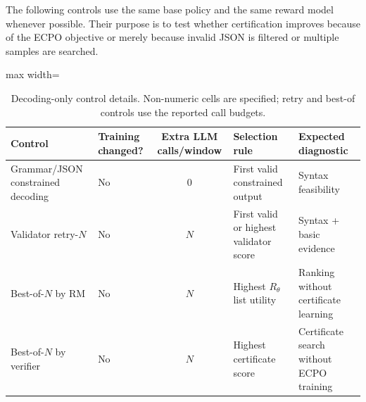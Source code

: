 \documentclass{article}
\begin{document}
The following controls use the same base policy and the same reward model whenever possible. Their purpose is to test whether certification improves because of the ECPO objective or merely because invalid JSON is filtered or multiple samples are searched.

\begin{table}[h]
\centering
\caption{Decoding-only control details. Non-numeric cells are specified; retry and best-of controls use the reported call budgets.}
\label{tab:decoding_control_details}
\small
\begin{adjustbox}{max width=\linewidth}
\begin{tabular}{l l c l l}
\toprule
Control & Training changed? & Extra LLM calls/window & Selection rule & Expected diagnostic \\
\midrule
Grammar/JSON constrained decoding & No & 0 & First valid constrained output & Syntax feasibility \\
Validator retry-$N$ & No & $N$ & First valid or highest validator score & Syntax + basic evidence \\
Best-of-$N$ by RM & No & $N$ & Highest $R_\theta$ list utility & Ranking without certificate learning \\
Best-of-$N$ by verifier & No & $N$ & Highest certificate score & Certificate search without ECPO training \\
\bottomrule
\end{tabular}
\end{adjustbox}
\end{table}
\end{document}
